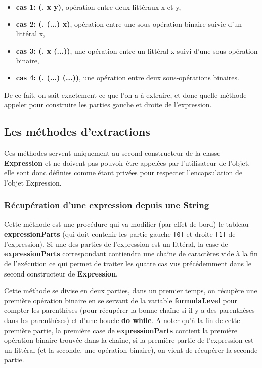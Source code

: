 \documentclass[a4paper]{article}
\begin{document}
  \begin{itemize}
    \item \textbf{cas 1: (. x y)}, opération entre deux littéraux x et y,
    \item \textbf{cas 2: (. (...) x)}, opération entre une sous opération binaire suivie d'un littéral x,
    \item \textbf{cas 3: (. x (...))}, une opération entre un littéral x suivi d'une sous opération binaire,
    \item \textbf{cas 4: (. (...) (...))}, une opération entre deux sous-opérations binaires. 
  \end{itemize}
  
  De ce fait, on sait exactement ce que l'on a à extraire, et donc quelle
  méthode appeler pour construire les parties gauche et droite de l'expression.

  \subsection{Les méthodes d'extractions}%
  \label{sub:Les méthodes d'extractions}

  Ces méthodes servent uniquement au second constructeur de la classe
  \textbf{Expression} et ne doivent pas pouvoir être appelées par l'utilisateur
  de l'objet, elle sont donc définies comme étant privées pour respecter
  l'encapsulation de l'objet Expression.

  \subsubsection{Récupération d'une expression depuis une String}%
  \label{ssub:Récupération d'une expression depuis une String}

  Cette méthode est une procédure qui va modifier (par effet de bord) le
  tableau \textbf{expressionParts} (qui doit contenir les partie gauche
  \texttt{[0]} et droite \texttt{[1]} de l'expression). Si une des parties de
  l'expression est un littéral, la case de \textbf{expressionParts}
  correspondant contiendra une chaîne de caractères vide à la fin de
  l'exécution ce qui permet de traiter les quatre cas vus précédemment dans le
  second constructeur de \textbf{Expression}.
  
  Cette méthode se divise en deux parties, dans un premier temps, on récupère
  une première opération binaire en se servant de la variable
  \textbf{formulaLevel} pour compter les parenthèses (pour récupérer la bonne
  chaîne si il y a des parenthèses dans les parenthèses) et d'une boucle
  \textbf{do while}. A noter qu'à la fin de cette première partie, la première
  case de \textbf{expressionParts} contient la première opération binaire
  trouvée dans la chaîne, si la première partie de l'expression est un littéral
  (et la seconde, une opération binaire), on vient de récupérer la seconde
  partie.
\end{document}
